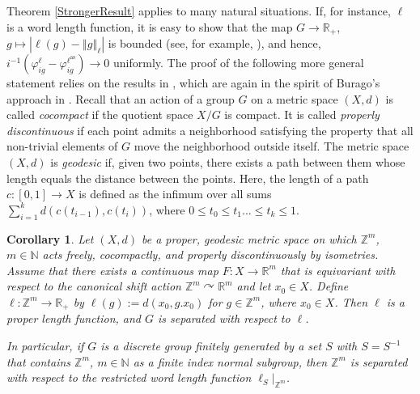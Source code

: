 \documentclass[a4paper,11pt,reqno]{amsart}
\numberwithin{equation}{section}
\numberwithin{equation}{section}
\newtheorem{corollary}[theorem]{Corollary}
\theoremstyle{definition}
\theoremstyle{remark}
\theoremstyle{remark}
\begin{document}
Theorem \ref{StrongerResult} applies to many natural situations.
If, for instance, $\ell$ is a word length function, it is easy to show
that the map $G\rightarrow\mathbb{R}_{+}$, $g\mapsto\left|\ell(g)-\left\Vert g\right\Vert _{\ell}\right|$
is bounded (see, for example, \cite[Lemma 3.5]{DLM12}), and hence, $i^{-1}(\varphi_{ig}^{\ell}-\varphi_{ig}^{\ell^{\text{as}}})\rightarrow0$
uniformly. The proof of the following more general statement
relies on the results in \cite{LOZ21}, which are again in the spirit
of Burago's approach in \cite{Burago}. Recall that an action of a
group $G$ on a metric space $(X,d)$ is called \emph{cocompact}
if the quotient space $X/G$ is compact. It is called \emph{properly
discontinuous} if each point admits a neighborhood satisfying the property
that all non-trivial elements of $G$ move the neighborhood outside
itself. The metric space $(X,d)$ is \emph{geodesic} if, given two
points, there exists a path between them whose length equals the distance
between the points. Here, the length of a path $c:[0,1]\rightarrow X$
is defined as the infimum over all sums $\sum_{i=1}^{k}d(c(t_{i-1}),c(t_{i}))$,
where $0\leq t_{0}\leq t_{1}...\le t_{k}\leq1$.

\begin{corollary} \label{OrbitMetric} Let $(X,d)$ be a proper, geodesic
metric space on which $\mathbb{Z}^{m}$, $m \in \mathbb{N}$ acts freely, cocompactly, and
properly discontinuously by isometries. Assume that there exists a
continuous map $F:X\rightarrow\mathbb{R}^{m}$ that is equivariant
with respect to the canonical shift action $\mathbb{Z}^{m}\curvearrowright\mathbb{R}^{m}$
and let $x_{0}\in X$. Define $\ell:\mathbb{Z}^{m}\rightarrow\mathbb{R}_{+}$
by $\ell(g):=d(x_{0},g.x_{0})$ for $g\in\mathbb{Z}^{m}$, where $x_{0}\in X$.
Then $\ell$ is a proper length function, and $G$ is separated with
respect to $\ell$.

In particular, if $G$ is a discrete group finitely generated by a
set $S$ with $S=S^{-1}$ that contains $\mathbb{Z}^{m}$, $m \in \mathbb{N}$ as a finite
index normal subgroup, then $\mathbb{Z}^m$ is separated with respect to the
restricted word length function $\ell_{S}|_{\mathbb{Z}^{m}}$. \end{corollary}
\end{document}
